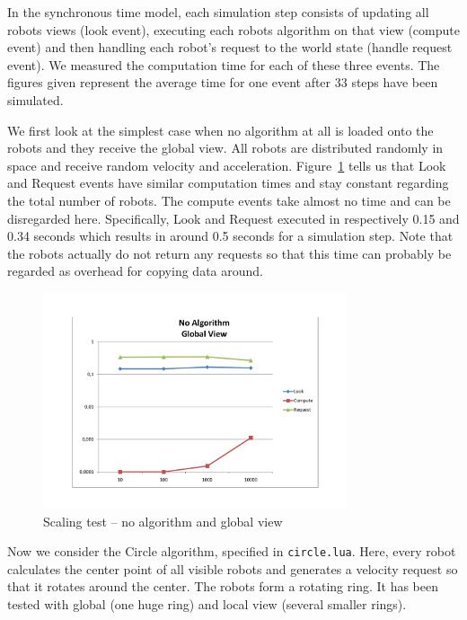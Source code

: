 In the synchronous time model, each simulation step consists of updating all robots views (look event), executing each robots algorithm on that view (compute event) and then handling each robot's request to the world state (handle request event). We measured the computation time for each of these three events. The figures given represent the average time for one event after 33 steps have been simulated.

We first look at the simplest case when no algorithm at all is loaded onto the robots and they receive the global view. All robots are distributed randomly in space and receive random velocity and acceleration. Figure~\ref{pic:scaling:noglobal} tells us that Look and Request events have similar computation times and stay constant regarding the total number of robots. The compute events take almost no time and can be disregarded here. Specifically, Look and Request executed in respectively 0.15 and 0.34 seconds which results in around 0.5 seconds for a simulation step. Note that the robots actually do not return any requests so that this time can probably be regarded as overhead for copying data around.

\begin{figure}[p]
	\begin{center}
	\includegraphics[width=0.8\textwidth]{scaling-no-global}
	\caption{Scaling test -- no algorithm and global view}
	\label{pic:scaling:noglobal}
	\end{center}
\end{figure}

Now we consider the Circle algorithm, specified in \texttt{circle.lua}. Here, every robot calculates the center point of all visible robots and generates a velocity request so that it rotates around the center. The robots form a rotating ring. It has been tested with global (one huge ring) and local view (several smaller rings).

